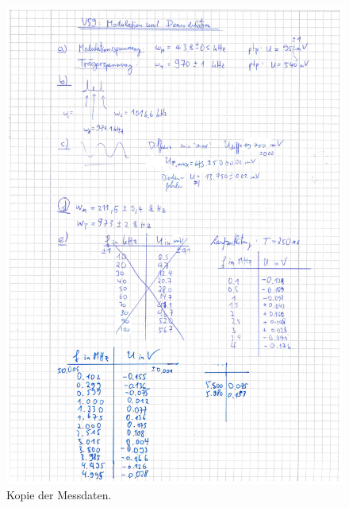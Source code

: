 \begin{figure}[h]
  \centering
  \includegraphics[width=.9\textwidth]{Messwerte.pdf}
  \caption{Kopie der Messdaten.}
  \label{fig:hnachSchwingkreis}
\end{figure}
